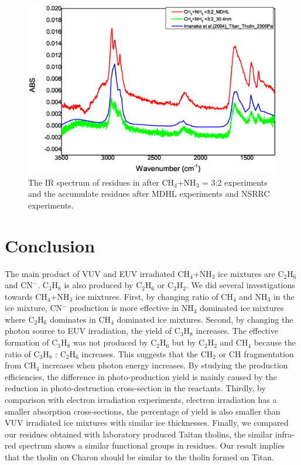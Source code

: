 \begin{figure}
\centering
\includegraphics[width=\textwidth]{figures/chapter3/residue.eps}
\caption{The IR spectrum of residues in after CH$_4$+NH$_3$ = 3:2 experiments and the accumulate residues after MDHL experiments and NSRRC experiments.}
\label{fig:residues}
\end{figure}


\section{Conclusion} %

The main product of VUV and EUV irradiated CH$_4$+NH$_3$ ice mixtures are C$_2$H$_6$ and CN$^-$. C$_3$H$_8$ is also produced by C$_2$H$_6$ or C$_2$H$_2$. We did several investigations towards CH$_4$+NH$_3$ ice mixtures. First, by changing ratio of CH$_4$ and NH$_3$ in the ice mixture, CN$^-$ production is more effective in NH$_3$ dominated ice mixtures where C$_2$H$_6$ dominates in CH$_4$ dominated ice mixtures. Second, by changing the photon source to EUV irradiation, the yield of C$_3$H$_8$ increases. The effective formation of C$_3$H$_8$ was not produced by C$_2$H$_6$ but by C$_2$H$_2$ and CH$_4$ because the ratio of C$_3$H$_8$ : C$_2$H$_6$ increases. This suggests that the CH$_2$ or CH fragmentation from CH$_4$ increases when photon energy increases. By studying the production efficiencies, the difference in photo-production yield is mainly caused by the reduction in photo-destruction cross-section in the reactants. Thirdly, by comparison with electron irradiation experiments, electron irradiation has a smaller absorption cross-sections, the percentage of yield is also smaller than VUV irradiated ice mixtures with similar ice thicknesses. Finally, we compared our residues obtained with laboratory produced Taitan tholins, the similar infra-red spectrum shows a similar functional groups in residues. Our result implies that the tholin on Charon should be similar to the tholin formed on Titan.


